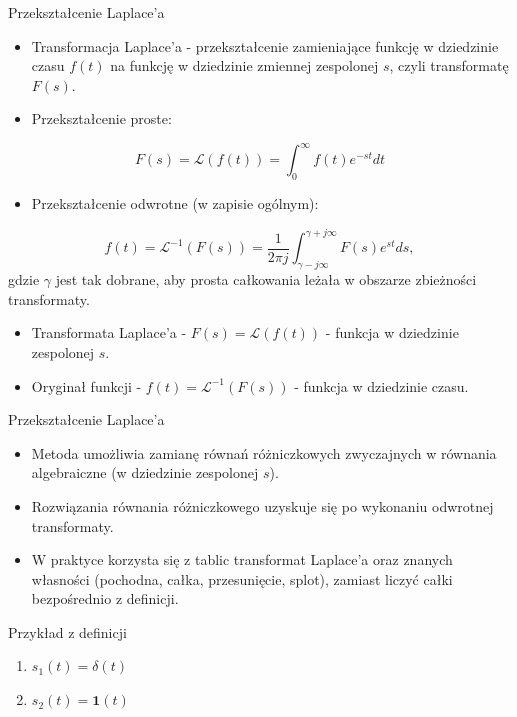 
\begin{frame}{Przekształcenie Laplace'a}
	\begin{itemize}
		\item[\bt] Transformacja Laplace'a - przekształcenie zamieniające funkcję w dziedzinie czasu $f(t)$ na funkcję w dziedzinie zmiennej zespolonej $s$, czyli transformatę $F(s)$.
		\item[\bt] Przekształcenie proste:
	\end{itemize}
	\begin{equation*}
		F(s) = \mathcal{L} \left( f(t) \right) = \int_{0}^{\infty} f(t) e^{-st} dt
	\end{equation*}
	\begin{itemize}
		\item[\bt] Przekształcenie odwrotne (w zapisie ogólnym):
	\end{itemize}
	\begin{equation*}
		f(t) = \mathcal{L}^{-1} \left( F(s) \right) = \frac{1}{2 \pi j} \int_{\gamma - j\infty}^{\gamma + j\infty} F(s) e^{st} ds,
	\end{equation*}
	gdzie $\gamma$ jest tak dobrane, aby prosta całkowania leżała w obszarze zbieżności transformaty.
	\begin{itemize}
		\item[\bt] Transformata Laplace'a - $F(s)=\mathcal{L}(f(t))$ - funkcja w dziedzinie zespolonej $s$.
		\item[\bt] Oryginał funkcji - $f(t)=\mathcal{L}^{-1}(F(s))$ - funkcja w dziedzinie czasu.
	\end{itemize}
\end{frame}

\begin{frame}{Przekształcenie Laplace'a}
	\begin{itemize}
		\item[\bt] Metoda umożliwia zamianę równań różniczkowych zwyczajnych w równania algebraiczne (w dziedzinie zespolonej $s$).
		\item[\bt] Rozwiązania równania różniczkowego uzyskuje się po wykonaniu odwrotnej transformaty.
		\item[\bt] W praktyce korzysta się z tablic transformat Laplace'a oraz znanych własności (pochodna, całka, przesunięcie, splot), zamiast liczyć całki bezpośrednio z definicji.
	\end{itemize}
\end{frame}

\begin{frame}{Przykład z definicji}
	\begin{enumerate}
		\item[\bt] $s_1(t) = \delta (t)$
		\item[\bt] $s_2(t) = \mathbf{1} (t)$
	\end{enumerate}
\end{frame}

